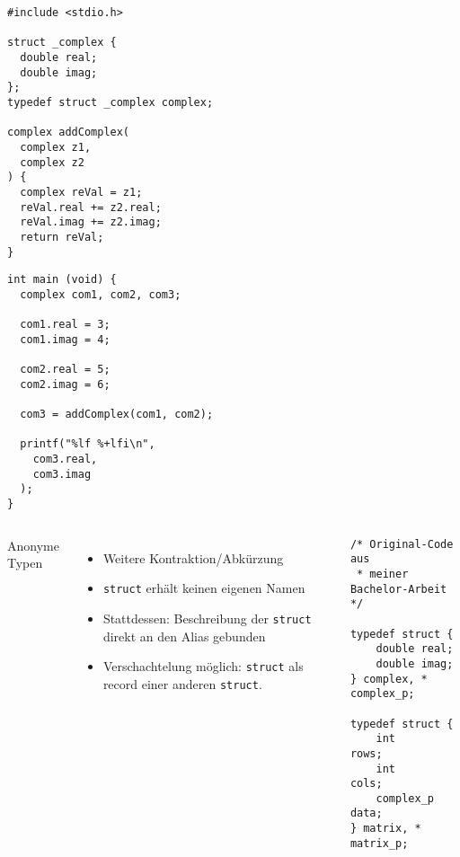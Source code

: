 \begin{frame}[fragile]
%
%
\begin{codebox}
\begin{verbatim}
#include <stdio.h>

struct _complex {
  double real;
  double imag;
};
typedef struct _complex complex;

complex addComplex(
  complex z1, 
  complex z2
) {
  complex reVal = z1;
  reVal.real += z2.real;
  reVal.imag += z2.imag;
  return reVal;
}

\end{verbatim}
\end{codebox}
%
\begin{codebox}[... Fortsetzung]
\begin{verbatim}
int main (void) {
  complex com1, com2, com3;
  
  com1.real = 3;
  com1.imag = 4;
  
  com2.real = 5;
  com2.imag = 6;
  
  com3 = addComplex(com1, com2);
  
  printf("%lf %+lfi\n", 
    com3.real, 
    com3.imag
  );
}
\end{verbatim}
\end{codebox}
%
\end{frame}


\begin{frame}[fragile]%
%
\begin{columns}[T]
\begin{Large}
Anonyme Typen
\vspace{10pt}
\end{Large}
%
\begin{itemize}
\item Weitere Kontraktion/Abkürzung
\item \texttt{struct} erhält keinen eigenen Namen
\item Stattdessen: Beschreibung der \texttt{struct} direkt an den Alias gebunden
\item Verschachtelung möglich: \texttt{struct} als record einer anderen \texttt{struct}.
\end{itemize}
%
\begin{codebox}
\begin{verbatim}
/* Original-Code aus 
 * meiner Bachelor-Arbeit */
 
typedef struct {
	double real;
	double imag;
} complex, * complex_p;

typedef struct {
	int       rows;
	int       cols;
	complex_p data;
} matrix, * matrix_p;
\end{verbatim}
\end{codebox}
%
\end{columns}
%
\end{frame}

